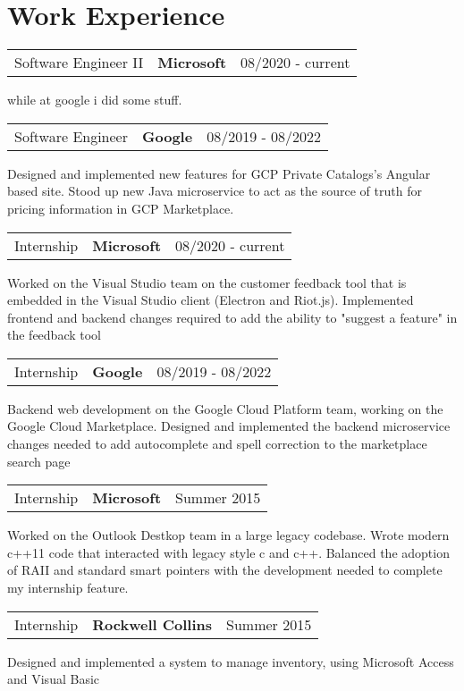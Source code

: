 \documentclass[12pt, letterpaper, oneside, final]{scrartcl}
\newcommand{\gray}{\rowcolor[gray]{.90}} %
\begin{document}
	
	
	{\fontsize{25}{25}\selectfont\scshape{}}
	
	\vspace{1cm}
	
	\section{Work Experience}
	
	\begin{tabularx}{0.97\linewidth}{X C R}
		\gray Software Engineer II & \textbf{Microsoft} & 08/2020 - current \\
	\end{tabularx}

	while at google i did some stuff.
	
	\begin{tabularx}{0.97\linewidth}{X C R}
		\gray Software Engineer & \textbf{Google} & 08/2019 - 08/2022 \\
	\end{tabularx}

	Designed and implemented new features for GCP Private Catalogs's Angular based site. Stood up new Java microservice to act as the source of truth for pricing information in GCP Marketplace. 
	
	\begin{tabularx}{0.97\linewidth}{X C R}
		\gray Internship & \textbf{Microsoft} & 08/2020 - current \\
	\end{tabularx}
	Worked on the Visual Studio team on the customer feedback tool that is embedded in the Visual Studio client (Electron and Riot.js). Implemented frontend and backend changes required to add the ability to "suggest a feature" in the feedback tool
	
	\begin{tabularx}{0.97\linewidth}{X C R}
		\gray Internship & \textbf{Google} & 08/2019 - 08/2022 \\
	\end{tabularx}
	Backend web development on the Google Cloud Platform team, working on the Google Cloud Marketplace. Designed and implemented the backend microservice changes needed to add autocomplete and spell correction to the marketplace search page

	\begin{tabularx}{0.97\linewidth}{X C R}
		\gray Internship & \textbf{Microsoft} & Summer 2015 \\
	\end{tabularx}
	Worked on the Outlook Destkop team in a large legacy codebase. Wrote modern c++11 code that interacted with legacy style c and c++. Balanced the adoption of RAII and standard smart pointers with the development needed to complete my internship feature.
	\begin{tabularx}{0.97\linewidth}{X C R}
		\gray Internship & \textbf{Rockwell Collins} & Summer 2015 \\
	\end{tabularx}
	Designed and implemented a system to manage inventory, using Microsoft Access and Visual Basic
\end{document}
